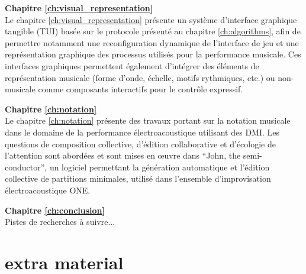 \textbf{Chapitre \ref{ch:visual_representation}} \\[0.2em]
Le chapitre \ref{ch:visual_representation} présente un système d'interface graphique tangible (TUI) basée sur le protocole présenté au chapitre  \ref{ch:algorithms}, afin de permettre notamment une reconfiguration dynamique de l'interface de jeu et une représentation graphique des processus utilisés pour la performance musicale. Ces interfaces graphiques permettent également d'intégrer des éléments de représentation musicale (forme d'onde, échelle, motifs rythmiques, etc.) ou non-musicale comme composants interactifs pour le contrôle expressif.

\textbf{Chapitre \ref{ch:notation}} \\[0.2em]
Le chapitre \ref{ch:notation} présente des travaux portant sur la notation musicale dans le domaine de la performance électroacoustique utilisant des DMI. Les questions de composition collective, d'édition collaborative et d'écologie de l'attention sont abordées et sont mises en œuvre dans ``John, the semi-conductor'', un logiciel permettant la génération automatique et l'édition collective de partitions minimales, utilisé dans l'ensemble d'improvisation électroacoustique ONE. 

\textbf{Chapitre \ref{ch:conclusion}} \\[0.2em]
Pistes de recherches à suivre...


\section*{extra material}
